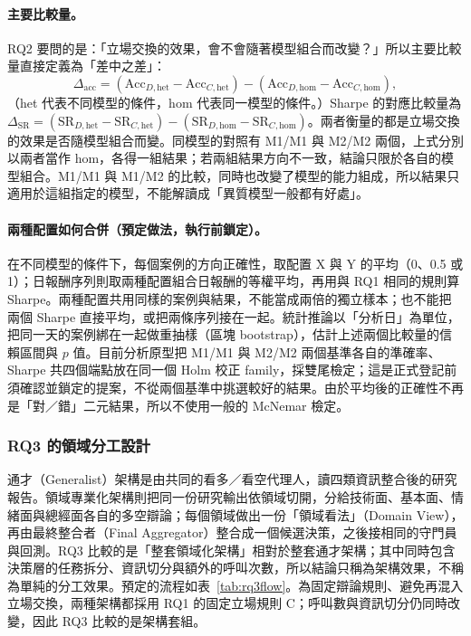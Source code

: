\paragraph{主要比較量。} RQ2 要問的是：「立場交換的效果，會不會隨著模型組合而改變？」所以主要比較量直接定義為「差中之差」：
\[
\Delta_{\mathrm{acc}}=(\mathrm{Acc}_{D,\mathrm{het}}-\mathrm{Acc}_{C,\mathrm{het}})-(\mathrm{Acc}_{D,\mathrm{hom}}-\mathrm{Acc}_{C,\mathrm{hom}}),
\]
（het 代表不同模型的條件，hom 代表同一模型的條件。）Sharpe 的對應比較量為 $\Delta_{\mathrm{SR}}=(\mathrm{SR}_{D,\mathrm{het}}-\mathrm{SR}_{C,\mathrm{het}})-(\mathrm{SR}_{D,\mathrm{hom}}-\mathrm{SR}_{C,\mathrm{hom}})$。兩者衡量的都是立場交換的效果是否隨模型組合而變。同模型的對照有 M1/M1 與 M2/M2 兩個，上式分別以兩者當作 hom，各得一組結果；若兩組結果方向不一致，結論只限於各自的模型組合。M1/M1 與 M1/M2 的比較，同時也改變了模型的能力組成，所以結果只適用於這組指定的模型，不能解讀成「異質模型一般都有好處」。

\paragraph{兩種配置如何合併（預定做法，執行前鎖定）。} 在不同模型的條件下，每個案例的方向正確性，取配置 X 與 Y 的平均（0、0.5 或 1）；日報酬序列則取兩種配置組合日報酬的等權平均，再用與 RQ1 相同的規則算 Sharpe。兩種配置共用同樣的案例與結果，不能當成兩倍的獨立樣本；也不能把兩個 Sharpe 直接平均，或把兩條序列接在一起。統計推論以「分析日」為單位，把同一天的案例綁在一起做重抽樣（區塊 bootstrap），估計上述兩個比較量的信賴區間與 $p$ 值。目前分析原型把 M1/M1 與 M2/M2 兩個基準各自的準確率、Sharpe 共四個端點放在同一個 Holm 校正 family，採雙尾檢定；這是正式登記前須確認並鎖定的提案，不從兩個基準中挑選較好的結果。由於平均後的正確性不再是「對／錯」二元結果，所以不使用一般的 McNemar 檢定。

\subsubsection{RQ3 的領域分工設計}
通才（Generalist）架構是由共同的看多／看空代理人，讀四類資訊整合後的研究報告。領域專業化架構則把同一份研究輸出依領域切開，分給技術面、基本面、情緒面與總經面各自的多空辯論；每個領域做出一份「領域看法」（Domain View），再由最終整合者（Final Aggregator）整合成一個候選決策，之後接相同的守門員與回測。RQ3 比較的是「整套領域化架構」相對於整套通才架構；其中同時包含決策層的任務拆分、資訊切分與額外的呼叫次數，所以結論只稱為架構效果，不稱為單純的分工效果。預定的流程如表~\ref{tab:rq3flow}。為固定辯論規則、避免再混入立場交換，兩種架構都採用 RQ1 的固定立場規則 C；呼叫數與資訊切分仍同時改變，因此 RQ3 比較的是架構套組。

